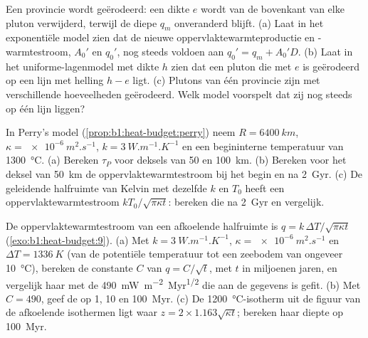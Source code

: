 \begin{exercise}[$\star\star\star$]\label{exo:b1:heat-budget:10}
Een provincie wordt geërodeerd: een dikte $e$ wordt van de bovenkant van elke pluton verwijderd, terwijl de diepe  $q_m$ onveranderd blijft. (a) Laat in het exponentiële model zien dat de nieuwe oppervlaktewarmteproductie en -warmtestroom, $A_0'$ en $q_0'$, nog steeds voldoen aan $q_0' = q_m + A_0'D$. (b) Laat in het uniforme-lagenmodel met dikte $h$ zien dat een pluton die met $e$ is geërodeerd op een lijn met helling $h - e$ ligt. (c) Plutons van één provincie zijn met verschillende hoeveelheden geërodeerd. Welk model voorspelt dat zij nog steeds op één lijn liggen?
\end{exercise}

\begin{exercise}[$\star\star\star$]\label{exo:b1:heat-budget:11}
In Perry's model (\cref{prop:b1:heat-budget:perry}) neem $R = \qty{6400}{km}$, $\kappa = \qty{e-6}{m^2.s^{-1}}$, $k = \qty{3}{W.m^{-1}.K^{-1}}$ en een begininterne temperatuur van \qty{1300}{\degreeCelsius}. (a) Bereken $\tau_P$ voor deksels van 50 en \qty{100}{km}. (b) Bereken voor het deksel van \qty{50}{km} de oppervlaktewarmtestroom bij het begin en na \qty{2}{Gyr}. (c) De geleidende halfruimte van Kelvin met dezelfde $k$ en $T_0$ heeft een oppervlaktewarmtestroom $kT_0/\sqrt{\pi\kappa t}$: bereken die na \qty{2}{Gyr} en vergelijk.
\end{exercise}

\begin{exercise}[$\star\star\star$]\label{exo:b1:heat-budget:12}
De oppervlaktewarmtestroom van een afkoelende halfruimte is $q = k\,\Delta T/\sqrt{\pi\kappa t}$ (\cref{exo:b1:heat-budget:9}). (a) Met $k = \qty{3}{W.m^{-1}.K^{-1}}$, $\kappa =
\qty{e-6}{m^2.s^{-1}}$ en $\Delta T = \qty{1336}{K}$ (van de potentiële temperatuur tot een zeebodem van ongeveer \qty{10}{\degreeCelsius}), bereken de constante $C$ van $q = C/\sqrt t$, met $t$ in miljoenen jaren, en vergelijk haar met de \qty{490}{mW.m^{-2}.Myr^{1/2}} die aan de gegevens is gefit. (b) Met $C = 490$, geef de  op 1, 10 en \qty{100}{Myr}. (c) De \qty{1200}{\degreeCelsius}-isotherm uit de figuur van de afkoelende isothermen ligt waar $z = 2\times1.163\sqrt{\kappa t}$; bereken haar diepte op \qty{100}{Myr}.
\end{exercise}

